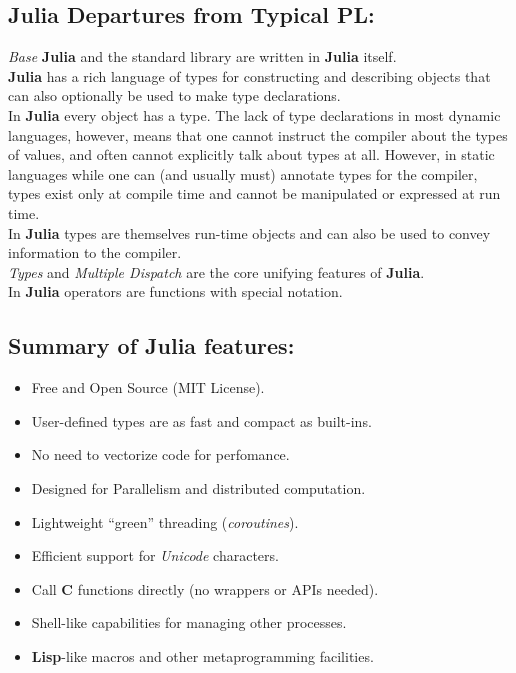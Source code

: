 \documentclass[
]{article}
\providecommand{\tightlist}{%
  \setlength{\itemsep}{0pt}\setlength{\parskip}{0pt}}
\begin{document}
\hypertarget{julia-departures-from-typical-pl}{%
\subsection{Julia Departures from Typical
PL:}\label{julia-departures-from-typical-pl}}

\emph{Base} \textbf{Julia} and the standard library are written in
\textbf{Julia} itself.\\
\textbf{Julia} has a rich language of types for constructing and
describing objects that can also optionally be used to make type
declarations.\\
In \textbf{Julia} every object has a type. The lack of type declarations
in most dynamic languages, however, means that one cannot instruct the
compiler about the types of values, and often cannot explicitly talk
about types at all. However, in static languages while one can (and
usually must) annotate types for the compiler, types exist only at
compile time and cannot be manipulated or expressed at run time.\\
In \textbf{Julia} types are themselves run-time objects and can also be
used to convey information to the compiler.\\
\emph{Types} and \emph{Multiple Dispatch} are the core unifying features
of \textbf{Julia}.\\
In \textbf{Julia} operators are functions with special notation.

\hypertarget{summary-of-julia-features}{%
\subsection{Summary of Julia
features:}\label{summary-of-julia-features}}

\begin{itemize}
\tightlist
\item
  Free and Open Source (MIT License).
\item
  User-defined types are as fast and compact as built-ins.
\item
  No need to vectorize code for perfomance.
\item
  Designed for Parallelism and distributed computation.
\item
  Lightweight ``green'' threading (\emph{coroutines}).
\item
  Efficient support for \emph{Unicode} characters.
\item
  Call \textbf{C} functions directly (no wrappers or APIs needed).
\item
  Shell-like capabilities for managing other processes.
\item
  \textbf{Lisp}-like macros and other metaprogramming facilities.
\end{itemize}
\end{document}
